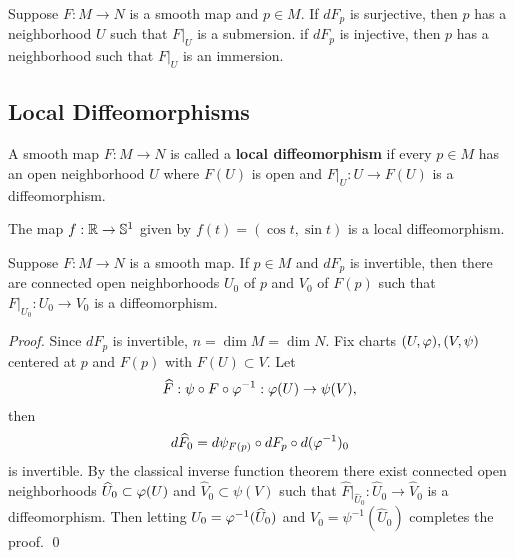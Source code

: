\begin{proposition}
    Suppose $F:M \to N$ is a smooth map and $p \in M$. If $dF_p$ is surjective, then $p$ has a neighborhood $U$ such that $F|_U$ is a submersion. 
    if $dF_p$ is injective, then $p$ has a neighborhood such that $F|_U$ is an immersion. 
\end{proposition}

\subsection{Local Diffeomorphisms}
A smooth map $F:M \to N$ is called a \textbf{local diffeomorphism} if every $p \in M$ has an open neighborhood $U$ where $F(U)$ is open and $F|_U:U \to F(U)$ is a diffeomorphism. 
\begin{example}
    The map $f:\mathbb{R} \to \mathbb{S}^1$ given by $f(t) = (\cos t, \sin t)$ is a local diffeomorphism. 
\end{example}
\begin{theorem}
    Suppose $F:M \to N$ is a smooth map. If $p \in M$ and $dF_p$ is invertible, then there are connected open neighborhoods $U_0$ of $p$ and $V_0$ of $F(p)$ such that $F|_{U_0}: U_0 \to V_0$ is a diffeomorphism. 
\end{theorem}
\begin{proof}
    Since $dF_p$ is invertible, $n = \dim M = \dim N$. Fix charts $(U,\varphi), (V,\psi)$ centered at $p$ and $F(p)$ with $F(U) \subset V$. Let 
    $$\widehat{F}: \psi \circ F \circ \varphi^{-1}: \varphi(U) \to \psi(V), $$ then 
    $$ d\widehat{F}_0 = d\psi_{F(p)} \circ dF_p \circ d(\varphi^{-1})_0 $$ is invertible. By the classical inverse function theorem there exist connected open neighborhoods $\widehat{U}_0 \subset \varphi(U)$ and $\hat{V}_0 \subset \psi(V)$ such that 
    $\hat{F}|_{\hat{U}_0}: \hat{U}_0 \to \hat{V}_0$ is a diffeomorphism. Then letting $U_0 = \varphi^{-1}(\widehat{U}_0)$ and $V_0 = \psi^{-1}(\hat{U}_0)$ completes the proof. \qed 
\end{proof}


